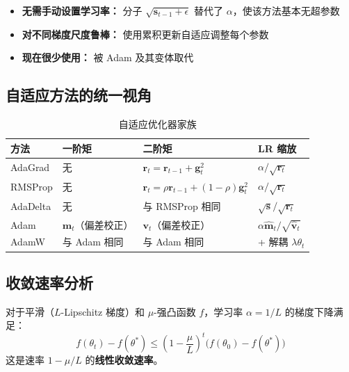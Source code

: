 \begin{properties}
\begin{itemize}
    \item \textbf{无需手动设置学习率：} 分子 $\sqrt{\mathbf{s}_{t-1} + \epsilon}$ 替代了 $\alpha$，使该方法基本无超参数
    \item \textbf{对不同梯度尺度鲁棒：} 使用累积更新自适应调整每个参数
    \item \textbf{现在很少使用：} 被 Adam 及其变体取代
\end{itemize}
\end{properties}

\subsection{自适应方法的统一视角}

\begin{table}[ht]
    \centering
    \caption{自适应优化器家族}
    \begin{tabular}{L{2cm} L{3cm} L{3cm} L{3.5cm}}
        \toprule
        \textbf{方法} & \textbf{一阶矩} & \textbf{二阶矩} & \textbf{LR 缩放} \\
        \midrule
        AdaGrad & 无 & $\mathbf{r}_t = \mathbf{r}_{t-1} + \mathbf{g}_t^2$ & $\alpha / \sqrt{\mathbf{r}_t}$ \\
        RMSProp & 无 & $\mathbf{r}_t = \rho\mathbf{r}_{t-1} + (1-\rho)\mathbf{g}_t^2$ & $\alpha / \sqrt{\mathbf{r}_t}$ \\
        AdaDelta & 无 & 与 RMSProp 相同 & $\sqrt{\mathbf{s}} / \sqrt{\mathbf{r}_t}$ \\
        Adam & $\mathbf{m}_t$（偏差校正） & $\mathbf{v}_t$（偏差校正） & $\alpha \hat{\mathbf{m}}_t / \sqrt{\hat{\mathbf{v}}_t}$ \\
        AdamW & 与 Adam 相同 & 与 Adam 相同 & + 解耦 $\lambda\theta_t$ \\
        \bottomrule
    \end{tabular}
\end{table}

\subsection{收敛速率分析}

\begin{theorem}
对于平滑（$L$-Lipschitz 梯度）和 $\mu$-强凸函数 $f$，学习率 $\alpha = 1/L$ 的梯度下降满足：
\begin{equation}
f(\theta_t) - f(\theta^*) \leq \left(1 - \frac{\mu}{L}\right)^t \bigl(f(\theta_0) - f(\theta^*)\bigr)
\end{equation}
这是速率 $1 - \mu/L$ 的\textbf{线性收敛速率}。
\end{theorem}

